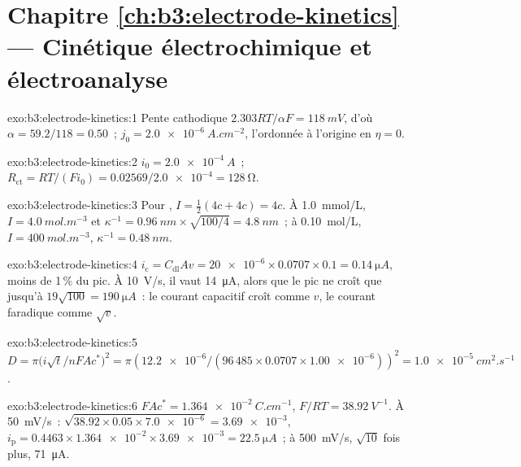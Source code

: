 \section*{Chapitre \ref{ch:b3:electrode-kinetics} --- Cinétique électrochimique et électroanalyse}

\begin{solution}{exo:b3:electrode-kinetics:1}
Pente cathodique $2.303RT/\alpha F = \qty{118}{mV}$, d'où $\alpha = 59.2/118 = 0.50$~; $j_0 = \qty{2.0e-6}{A.cm^{-2}}$,
l'ordonnée à l'origine en $\eta = 0$.
\end{solution}

\begin{solution}{exo:b3:electrode-kinetics:2}
$i_0 = \qty{2.0e-4}{A}$~; $R_{\mathrm{ct}} = RT/(Fi_0) = 0.02569/\num{2.0e-4} = \qty{128}{\ohm}$.
\end{solution}

\begin{solution}{exo:b3:electrode-kinetics:3}
Pour , $I = \frac12(4c + 4c) = 4c$. À \qty{1.0}{mmol/L}, $I = \qty{4.0}{mol.m^{-3}}$ et $\kappa^{-1} =
\qty{0.96}{nm} \times \sqrt{100/4} = \qty{4.8}{nm}$~; à \qty{0.10}{mol/L}, $I = \qty{400}{mol.m^{-3}}$, $\kappa^{-1} = \qty{0.48}{nm}$.
\end{solution}

\begin{solution}{exo:b3:electrode-kinetics:4}
$i_{\mathrm c} = C_{\mathrm{dl}}Av = \num{20e-6} \times 0.0707 \times 0.1 = \qty{0.14}{\micro A}$,
moins de 1\,\% du pic. À
\qty{10}{V/s}, il vaut \qty{14}{\micro A}, alors que le pic ne croît
que jusqu'à $19\sqrt{100} = \qty{190}{\micro A}$~:
le courant capacitif croît comme $v$, le courant faradique comme $\sqrt v$.
\end{solution}

\begin{solution}{exo:b3:electrode-kinetics:5}
$D = \pi\bigl(i\sqrt t/nFAc^*\bigr)^2 = \pi(\num{12.2e-6}/(96\,485 \times 0.0707 \times \num{1.00e-6}))^2 =
\qty{1.0e-5}{cm^2.s^{-1}}$.
\end{solution}

\begin{solution}{exo:b3:electrode-kinetics:6}
$FAc^* = \qty{1.364e-2}{C.cm^{-1}}$, $F/RT = \qty{38.92}{V^{-1}}$. À \qty{50}{mV/s}~: $\sqrt{38.92 \times 0.05 \times \num{7.0e-6}} =
\num{3.69e-3}$, $i_{\mathrm p} = 0.4463 \times \num{1.364e-2} \times \num{3.69e-3} = \qty{22.5}{\micro A}$~;
à \qty{500}{mV/s}, $\sqrt{10}$ fois
plus, \qty{71}{\micro A}.
\end{solution}

